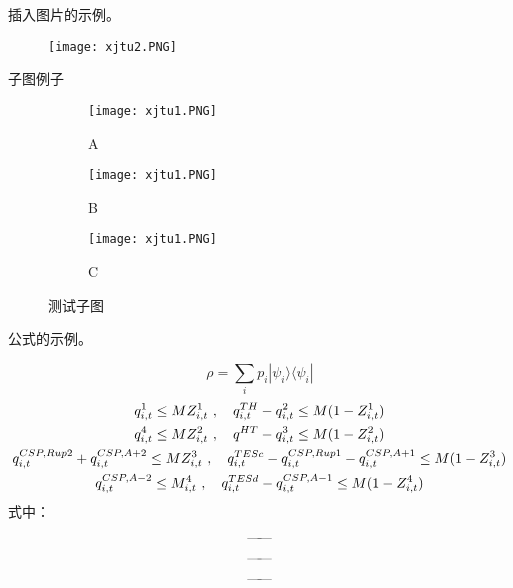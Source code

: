 插入图片的示例。

\begin{figure}[htbp]
   \centering
   \texttt{[image: xjtu2.PNG]} %
   \label{fig:example}
\end{figure}

子图例子

\begin{figure}[ht!]
    \centering
    \begin{subfigure}{.3\textwidth}
        \centering
        \texttt{[image: xjtu1.PNG]}
        \caption{A}
    \end{subfigure}
    \begin{subfigure}{.3\textwidth}
        \centering
        \texttt{[image: xjtu1.PNG]}
        \caption{B}
    \end{subfigure}
    \begin{subfigure}{.3\textwidth}
        \centering
        \texttt{[image: xjtu1.PNG]}
        \caption{C}
    \end{subfigure}
    \caption{测试子图}
\end{figure}


公式的示例。

\begin{equation}
\rho = \sum_i p_i  |\psi_i \rangle \langle \psi_i |
\end{equation}
\begin{gather}
q^1_{i,t}\le MZ^{1}_{i,t}\ , \quad q^{TH}_{i,t}-q^{2}_{i,t}\le M(1-Z^1_{i,t})\allowdisplaybreaks[2]\\
q^4_{i,t} \le MZ^2_{i,t}\ ,\quad q^{HT}-q^3_{i,t} \le M(1-Z^2_{i,t})\allowdisplaybreaks[2]\\
q^{CSP,Rup2}_{i,t}+q^{CSP,A+2}_{i,t} \le MZ^3_{i,t}\ ,\quad q^{TESc}_{i,t}-q^{CSP,Rup1}_{i,t}-q^{CSP,A+1}_{i,t} \le M(1-Z^3_{i,t})\allowdisplaybreaks[2]\\
q^{CSP,A-2}_{i,t}\le M^4_{i,t}\ ,\quad q^{TESd}_{i,t}-q^{CSP,A-1}_{i,t}\le M(1-Z^4_{i,t})
\end{gather}
式中：
\begin{align*}
\begin{alignedat}{3}
&  &\text{---\hspace*{-1mm}---}& \text{}\allowdisplaybreaks[2]\\
&  &\text{---\hspace*{-1mm}---}& \text{}\allowdisplaybreaks[2]\\
&  &\text{---\hspace*{-1mm}---}& \text{}\allowdisplaybreaks[2]\\
\end{alignedat}
\end{align*}


